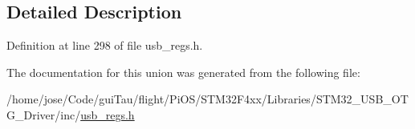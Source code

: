 \subsection{Detailed Description}


Definition at line 298 of file usb\-\_\-regs.\-h.



The documentation for this union was generated from the following file\-:\begin{DoxyCompactItemize}
\item 
/home/jose/\-Code/gui\-Tau/flight/\-Pi\-O\-S/\-S\-T\-M32\-F4xx/\-Libraries/\-S\-T\-M32\-\_\-\-U\-S\-B\-\_\-\-O\-T\-G\-\_\-\-Driver/inc/\hyperlink{_s_t_m32_f4xx_2_libraries_2_s_t_m32___u_s_b___o_t_g___driver_2inc_2usb__regs_8h}{usb\-\_\-regs.\-h}\end{DoxyCompactItemize}
